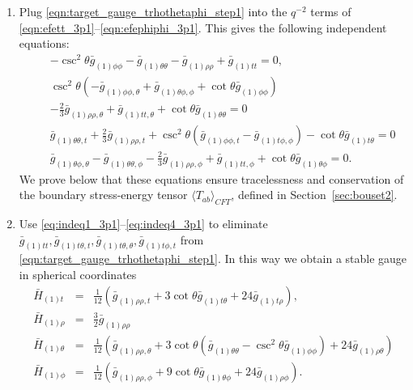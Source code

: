 \documentclass[a4paper,11pt]{article}
\numberwithin{equation}{section}
\begin{document}
\begin{enumerate}
\item Plug \eqref{eqn:target_gauge_trhothetaphi_step1} into the $q^{-2}$ terms of \eqref{eqn:efett_3p1}--\eqref{eqn:efephiphi_3p1}. This gives the following independent equations:
\begin{eqnarray}
\label{eq:indeq1_3p1}
&&-\csc ^2\theta\bar{g}_{(1) \phi \phi }-\bar{g}_{(1)\theta \theta }-\bar{g}_{(1) \rho \rho }+\bar{g}_{(1) \text{$tt$}}=0,\\
\label{eq:indeq2_3p1}
&&\csc ^2\theta \left(-\bar{g}_{(1) \phi \phi ,\theta }+\bar{g}_{(1)\theta \phi,\phi
   }+\cot \theta  \bar{g}_{(1) \phi \phi }\right)\nonumber\\
   &&-\frac{2}{3} \bar{g}_{(1) \rho \rho
   ,\theta }+\bar{g}_{(1) \text{$tt$},\theta }+\cot \theta  \bar{g}_{(1)\theta \theta}=0\\
   \label{eq:indeq3_3p1}
&&\bar{g}_{(1)\theta \theta,t}+\frac{2}{3} \bar{g}_{(1) \rho \rho ,t}+\csc ^2\theta 
   \left(\bar{g}_{(1) \phi \phi ,t}-\bar{g}_{(1) \text{$t$$\phi $},\phi }\right)-\cot \theta
   \bar{g}_{(1) \text{$t$$\theta $}}=0\\
      \label{eq:indeq4_3p1}
&&\bar{g}_{(1)\theta \phi,\theta }-\bar{g}_{(1)\theta \theta,\phi }-\frac{2}{3} \bar{g}_{(1)
   \rho \rho ,\phi }+\bar{g}_{(1) \text{$tt$},\phi }+\cot \theta \bar{g}_{(1)\theta \phi}=0.
\end{eqnarray}
We prove below that these equations ensure tracelessness and conservation of the boundary stress-energy tensor $\langle T_{ab}\rangle_{CFT}$, defined in Section~\ref{sec:bouset2}.

\item Use \eqref{eq:indeq1_3p1}--\eqref{eq:indeq4_3p1} to eliminate $\bar{g}_{(1)tt},\bar{g}_{(1)t\theta,t},\bar{g}_{(1)t\theta,\theta},\bar{g}_{(1)t\phi,t}$ from \eqref{eqn:target_gauge_trhothetaphi_step1}.
In this way we obtain a stable gauge in spherical coordinates
\begin{eqnarray}\label{eqn:target_gauge_trhothetaphi}
\bar{H}_{(1)t}&=&\frac{1}{12} \left(\bar{g}_{(1) \rho \rho ,t}+3 \cot \theta  \bar{g}_{(1) \text{$t$$\theta
   $}}+24 \bar{g}_{(1) \text{$t$$\rho $}}\right), \nonumber\\
\bar{H}_{(1)\rho}&=&\frac{3}{2} \bar{g}_{(1) \rho \rho }\nonumber\\
\bar{H}_{(1)\theta}&=&\frac{1}{12} \left(\bar{g}_{(1) \rho \rho ,\theta }+3 \cot \theta  \left(\bar{g}_{(1)\theta\theta}-\csc ^2\theta \bar{g}_{(1) \phi \phi }\right)+24 \bar{g}_{(1) \rho \theta }\right)\nonumber\\
\bar{H}_{(1)\phi}&=&\frac{1}{12} \left(\bar{g}_{(1) \rho \rho ,\phi }+9 \cot \theta  \bar{g}_{(1)\theta \phi}+24 \bar{g}_{(1) \rho \phi }\right).
\end{eqnarray}
\end{enumerate}
\end{document}
